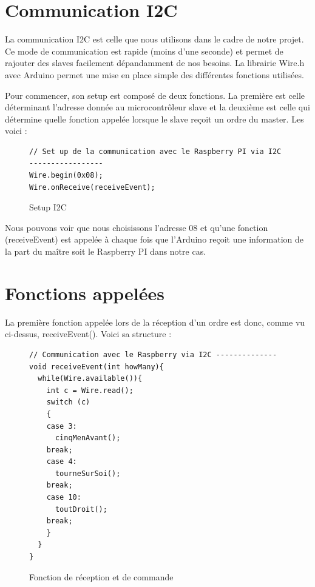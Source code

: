 \documentclass[
	a4paper,									%
	11pt,										%
	twoside,									%
	openright,									%
	notitlepage,									%
	parskip=half,								%
]{scrreprt}										%
\begin{document}
\section{Communication I2C}

La communication I2C est celle que nous utilisons dans le cadre de notre projet. Ce mode de communication est rapide (moins d'une seconde) et permet de rajouter des slaves facilement
dépandamment de nos besoins. La librairie Wire.h avec Arduino permet une mise en place simple des différentes fonctions utilisées. \par

Pour commencer, son setup est composé de deux fonctions. La première est celle déterminant l'adresse donnée au microcontrôleur slave et la deuxième est celle qui détermine quelle
fonction appelée lorsque le slave reçoit un ordre du master. Les voici : 
\begin{figure}[!ht]
	\begin{verbatim}
// Set up de la communication avec le Raspberry PI via I2C -----------------
Wire.begin(0x08);
Wire.onReceive(receiveEvent);
	\end{verbatim}
	\caption{Setup I2C}
	\label{codeI2C}
	\end{figure}

Nous pouvons voir que nous choisissons l'adresse 08 et qu'une fonction (receiveEvent) est appelée à chaque
fois que l'Arduino reçoit une information de la part du maître soit le Raspberry PI dans notre cas. 

\newpage
\section{Fonctions appelées}

La première fonction appelée lors de la réception d'un ordre est donc, comme vu ci-dessus, receiveEvent(). 
Voici sa structure : 

\begin{figure}[!ht]
	
	\begin{verbatim}
// Communication avec le Raspberry via I2C --------------
void receiveEvent(int howMany){
  while(Wire.available()){
    int c = Wire.read();
    switch (c)
    {
    case 3:
      cinqMenAvant();
    break;
    case 4:
      tourneSurSoi();
    break;
    case 10:
      toutDroit();
    break;
    }
  }
}
	\end{verbatim}
	\caption{Fonction de réception et de commande}
	\label{receiveEvent}
	\end{figure}
\end{document}
